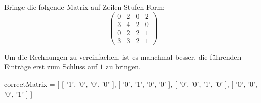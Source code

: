 \documentclass{ximera}
\begin{document}
\begin{question}
Bringe die folgende Matrix auf Zeilen-Stufen-Form:
\[
\left(
\begin{array}{ccccc}
0 & 2 & 0 & 2\\
3 & 4 & 2 & 0\\
0 & 2 & 2 & 1\\
3 & 3 & 2 & 1
\end{array}
\right)
\]
\begin{solution}
\begin{hint}
Um die Rechnungen zu vereinfachen, ist es manchmal besser, die führenden Einträge erst zum Schluss auf $1$ zu bringen.
\end{hint}
\begin{matrix-answer}
correctMatrix = [ [ '1',  '0', '0',  '0' ],
                  [ '0',  '1', '0',  '0' ],
                  [ '0',  '0', '1',  '0' ],
                  [ '0',  '0', '0',  '1' ]
]
\end{matrix-answer}
\end{solution}
\end{question}
\end{document}
